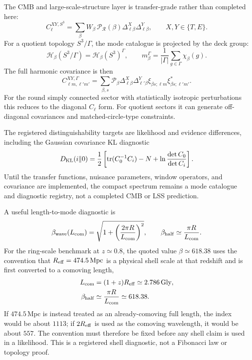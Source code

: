 \documentclass[aps,prd,onecolumn,superscriptaddress,longbibliography,nofootinbib,notitlepage]{revtex4-2}
\newcommand{\Gly}{\,\mathrm{Gly}}
\begin{document}
The CMB and large-scale-structure layer is transfer-grade rather than completed here:
\begin{equation}
  C_\ell^{XY,S^3}
  =\sum_\beta W_\beta\,
  \mathcal P_{\mathcal R}(\beta)
  \Delta_{\ell\beta}^{X}\Delta_{\ell\beta}^{Y},
  \qquad X,Y\in\{T,E\}.
\end{equation}
For a quotient topology $S^3/\Gamma$, the mode catalogue is projected by the deck group:
\begin{equation}
  \mathcal H_\beta(S^3/\Gamma)=\mathcal H_\beta(S^3)^\Gamma,
  \qquad
  m_\beta^\Gamma=\frac1{|\Gamma|}\sum_{g\in\Gamma}\chi_\beta(g).
\end{equation}
The full harmonic covariance is then
\begin{equation}
  C_{\ell m,\ell'm'}^{XY,\Gamma}
  =\sum_{\beta,s}
  \mathcal P_\beta\Delta_{\ell\beta}^X\Delta_{\ell'\beta}^Y
  \xi_{\beta s;\ell m}\xi^*_{\beta s;\ell'm'}.
\end{equation}
For the round simply connected sector with statistically isotropic perturbations this
reduces to the diagonal $C_\ell$ form. For quotient sectors it can generate off-diagonal
covariances and matched-circle-type constraints.

The registered distinguishability targets are likelihood and evidence differences,
including the Gaussian covariance KL diagnostic
\begin{equation}
  D_{\rm KL}(i\|0)=\frac12
  \left[\operatorname{tr}(C_0^{-1}C_i)-N
  +\ln\frac{\det C_0}{\det C_i}\right].
\end{equation}
Until the transfer functions, nuisance parameters, window operators, and covariance are
implemented, the compact spectrum remains a mode catalogue and diagnostic registry, not a
completed CMB or LSS prediction.

A useful length-to-mode diagnostic is
\begin{equation}
  \beta_{\rm wave}(L_{\rm com})=
  \sqrt{1+\left(\frac{2\pi R}{L_{\rm com}}\right)^2},
  \qquad
  \beta_{\rm half}\simeq\frac{\pi R}{L_{\rm com}}.
\end{equation}
For the ring-scale benchmark at $z\simeq0.8$, the quoted value $\beta\simeq618.38$
uses the convention that $R_{\rm eff}=474.5\,\mathrm{Mpc}$ is a physical shell scale
at that redshift and is first converted to a comoving length,
\begin{equation}
\begin{aligned}
  L_{\rm com}&=(1+z)R_{\rm eff}\simeq2.786\Gly,\\
  \beta_{\rm half}&\simeq\frac{\pi R}{L_{\rm com}}\simeq618.38 .
\end{aligned}
\end{equation}
If $474.5\,\mathrm{Mpc}$ is instead treated as an already-comoving full length, the
index would be about $1113$; if $2R_{\rm eff}$ is used as the comoving wavelength, it
would be about $557$. The convention must therefore be fixed before any shell claim is
used in a likelihood. This is a registered shell diagnostic, not a Fibonacci law or
topology proof.
\end{document}

